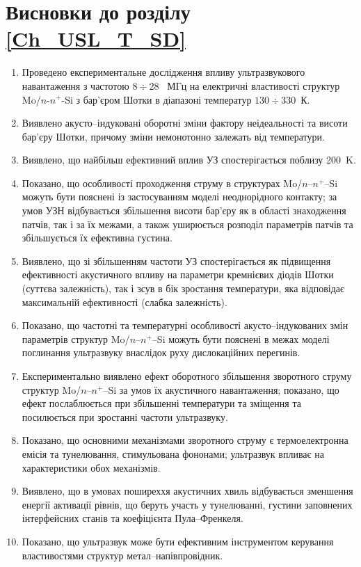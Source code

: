 \documentclass[a4paper,14pt,oneside,openany]{memoir}
\begin{document}
\section*{Висновки до розділу \ref{Ch_USL_T_SD}}
  \begin{enumerate}
     \item Проведено експериментальне дослідження впливу ультразвукового навантаження з частотою $8\div28$~ МГц на електричні властивості структур Mo/$n$-$n^{+}$-Si з бар'єром Шотки в діапазоні температур $130\div330$~К.

\item Виявлено акусто--індуковані оборотні зміни фактору неідеальності та висоти бар'єру Шотки, причому зміни немонотонно залежать від
температури.

\item Виявлено, що найбільш ефективний вплив УЗ спостерігається поблизу 200~K.


\item Показано, що особливості проходження  струму в структурах Mo/$n$--$n^{+}$--Si можуть бути пояснені із застосуванням моделі неоднорідного контакту;
 за умов УЗН відбувається збільшення висоти бар'єру як в області знаходження патчів, так і за їх межами, а також уширюється розподіл параметрів патчів та збільшується
їх ефективна густина.

\item Виявлено, що зі збільшенням частоти УЗ  спостерігається як підвищення ефективності акустичного впливу на параметри кремнієвих діодів Шотки (суттєва залежність),
так і зсув в бік зростання температури, яка відповідає максимальній ефективності (слабка залежність).

\item Показано, що частотні та температурні особливості акусто--індукованих змін параметрів структур Mo/$n$--$n^{+}$--Si можуть бути пояснені в межах
 моделі поглинання ультразвуку внаслідок руху дислокаційних перегинів.

\item Експериментально виявлено ефект оборотного збільшення зворотного струму структур Mo/$n$--$n^{+}$--Si за умов їх акустичного навантаження;
показано, що ефект послаблюється при збільшенні температури та зміщення та посилюється при зростанні частоти ультразвуку.

\item Показано, що основними механізмами зворотного струму є термоелектронна емісія та тунелювання, стимульована фононами;
ультразвук впливає на характеристики обох механізмів.

\item Виявлено, що в умовах поширеххя акустичних хвиль відбувається зменшення енергії активації рівнів, що беруть участь у тунелюванні,
густини заповнених інтерфейсних станів та коефіцієнта Пула--Френкеля.

\item Показано, що ультразвук може бути ефективним інструментом керування властивостями структур метал--напівпровідник.
  \end{enumerate}	
\end{document}

